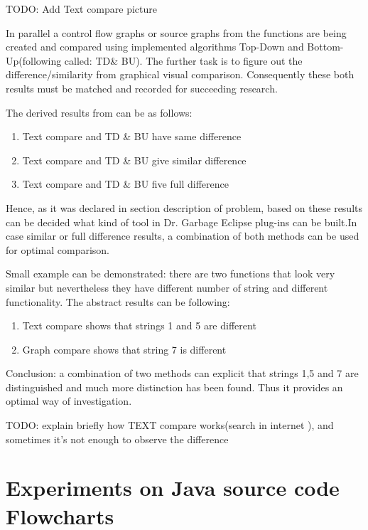 \documentclass{report}
\begin{document}
TODO: Add Text compare picture

In parallel a control flow graphs or source graphs from the functions are being created and compared using implemented algorithms Top-Down and Bottom-Up(following called: TD\& BU). The further task is to figure out the difference/similarity from graphical visual comparison. Consequently these both results must be matched and recorded for succeeding research.

The derived results from can be as follows: 
\begin{enumerate}
  \item Text compare and TD \& BU have same difference
  \item Text compare and TD \& BU give similar difference
  \item Text compare and TD \& BU five full difference
\end{enumerate}

Hence, as it was declared in section description of problem, based on these results can be decided what kind of tool in Dr. Garbage Eclipse plug-ins can be built.In case similar or full difference results, a combination of both methods can be used for optimal comparison. 

Small example can be demonstrated: there are two functions that look very similar but nevertheless they have different number of string and different functionality. The abstract results can be following:
\begin{enumerate}
	\item Text compare shows that strings 1 and 5 are different
	\item Graph compare shows that string 7 is different 
\end{enumerate}

Conclusion: a combination of two methods can explicit that strings 1,5 and 7 are distinguished and much more distinction has been found. Thus it provides an optimal way of investigation.



TODO: explain briefly how TEXT compare works(search in internet ), and sometimes it's not enough to observe the difference


\section{Experiments on Java source code Flowcharts}
\end{document}
